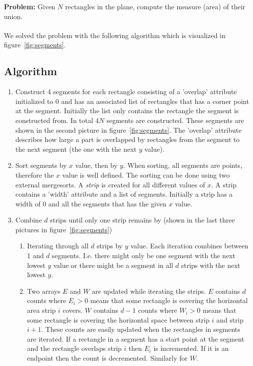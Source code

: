 \textbf{Problem:} Given $N$ rectangles in the plane, compute the measure (area) of their union.
\\
\\We solved the problem with the following algorithm which is visualized in figure~\ref{fig:segments}.

\subsection{Algorithm}

\begin{enumerate}
\item \label{enu:segments} Construct 4 segments for each rectangle consisting of a 'overlap' attribute initialized to 0 and has an associated list of rectangles that has a corner point at the segment. Initially the list only contains the rectangle the segment is constructed from. In total $4N$ segments are constructed. These segments are shown in the second picture in figure~\ref{fig:segments}. The 'overlap' attribute describes how large a part is overlapped by rectangles from the segment to the next segment (the one with the next $y$ value).
\item \label{enu:sorting} Sort segments by $x$ value, then by $y$. When sorting, all segments are points, therefore the $x$ value is well defined. The sorting can be done using two external mergesorts. A \emph{strip} is created for all different values of $x$. A strip contains a 'width' attribute and a list of segments. Initially a strip has a width of 0 and all the segments that has the given $x$ value.
\item \label{enum:combine} Combine $d$ strips until only one strip remains by (shown in the last three pictures in figure~\ref{fig:segments})
    \begin{enumerate}
        \item Iterating through all $d$ strips by $y$ value. Each iteration combines between 1 and $d$ segments. I.e. there might only be one segment with the next lowest $y$ value or there might be a segment in all $d$ strips with the next lowest $y$.
        \item Two arrays $E$ and $W$ are updated while iterating the strips. $E$ contains $d$ counts where $E_i>0$ means that some rectangle is covering the horizontal area strip $i$ covers. $W$ contains $d-1$ counts where $W_i>0$ means that some rectangle is covering the horizontal space between strip $i$ and strip $i+1$. These counts are easily updated when the rectangles in segments are iterated. If a rectangle in a segment has a start point at the segment and the rectangle overlaps strip $i$  then $E_i$ is incremented. If it is an endpoint then the count is decremented. Similarly for $W$.

\end{enumerate}
\end{enumerate}
